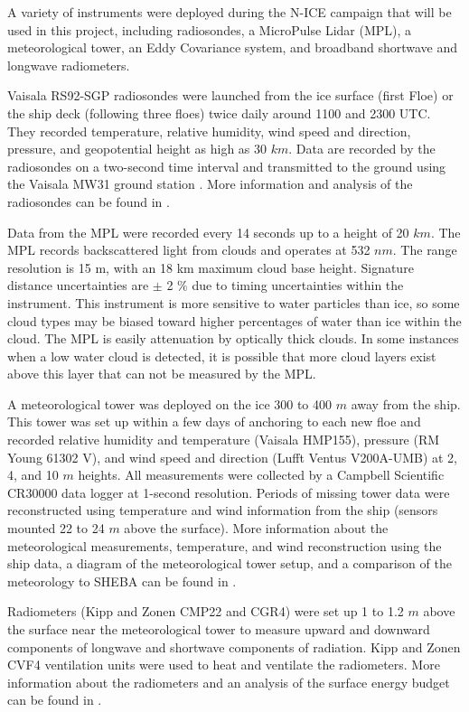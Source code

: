 A variety of instruments were deployed during the N-ICE campaign that will be used in this project, including  radiosondes, a MicroPulse Lidar (MPL), a meteorological tower, an Eddy Covariance system, and broadband shortwave and longwave radiometers. 

Vaisala RS92-SGP radiosondes were launched from the ice surface (first Floe) or the ship deck (following three floes) twice daily around 1100 and 2300 UTC. They recorded temperature, relative humidity, wind speed and direction, pressure, and geopotential height as high as 30 $km$. Data are recorded by the radiosondes on a two-second time interval and transmitted to the ground using the Vaisala MW31 ground station \citep{kayser:2017, cohen:2017}. More information and analysis of the radiosondes can be found in \citet{kayser:2017}.

Data from the MPL were recorded every 14 seconds up to a height of 20 $km$. The MPL records backscattered light from clouds and operates at 532 $nm$. The range resolution is 15 m, with an 18 km maximum cloud base height. Signature distance uncertainties are $\pm$ 2 $\%$ due to timing uncertainties within the instrument. This instrument is more sensitive to water particles than ice, so some cloud types may be biased toward higher percentages of water than ice within the cloud. The MPL is easily attenuation by optically thick clouds. In some instances when a low water cloud is detected, it is possible that more cloud layers exist above this layer that can not be measured by the MPL. 

A meteorological tower was deployed on the ice 300 to 400 $m$ away from the ship. This tower was set up within a few days of anchoring to each new floe and recorded relative humidity and temperature (Vaisala HMP155), pressure (RM Young 61302 V), and wind speed and direction (Lufft Ventus V200A-UMB) at 2, 4, and 10 $m$ heights. All measurements were collected by a Campbell Scientific CR30000 data logger at 1-second resolution. Periods of missing tower data were reconstructed using temperature and wind information from the ship (sensors mounted 22 to 24 $m$ above the surface). More information about the meteorological measurements, temperature, and wind reconstruction using the ship data, a diagram of the meteorological tower setup, and a comparison of the meteorology to SHEBA can be found in \citet{cohen:2017}.

Radiometers (Kipp and Zonen CMP22 and CGR4) were set up 1 to 1.2 $m$ above the surface near the meteorological tower to measure upward and downward components of longwave and shortwave components of radiation. Kipp and Zonen CVF4 ventilation units were used to heat and ventilate the radiometers. More information about the radiometers and an analysis of the surface energy budget can be found in \citet{walden:2017}.

